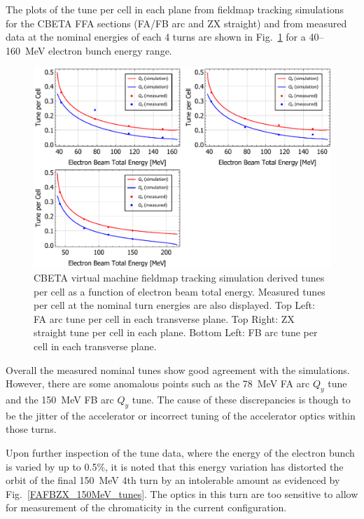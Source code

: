 \documentclass[../main.tex]{subfiles}
\begin{document}
The plots of the tune per cell in each plane from fieldmap tracking simulations for the CBETA FFA sections (FA/FB arc and ZX straight) and from measured data at the nominal energies of each 4 turns are shown in Fig.~\ref{fig:fieldmap_chromaticity_tune} for a 40--160~\si{\mega\electronvolt} electron bunch energy range.
\begin{figure}[!h]
\centering
\includegraphics[width=\textwidth]{Figures/CBETA_Multi-Pass_Commissioning/chromaticity/FAFBZX_nominal_tunes.pdf}
\caption{CBETA virtual machine fieldmap tracking simulation derived tunes per cell as a function of electron beam total energy. Measured tunes per cell at the nominal turn energies are also displayed. Top Left: FA arc tune per cell in each transverse plane. Top Right: ZX straight tune per cell in each plane. Bottom Left: FB arc tune per cell in each transverse plane. }
\label{fig:fieldmap_chromaticity_tune}
\end{figure}

Overall the measured nominal tunes show good agreement with the simulations. However, there are some anomalous points such as the 78~\si{\mega\electronvolt} FA arc $Q_{y}$ tune and the 150~\si{\mega\electronvolt} FB arc $Q_{y}$ tune. The cause of these discrepancies is though to be the jitter of the accelerator or incorrect tuning of the accelerator optics within those turns.

Upon further inspection of the tune data, where the energy of the electron bunch is varied by up to 0.5\%, it is noted that this energy variation has distorted the orbit of the final 150~\si{\mega\electronvolt} 4th turn by an intolerable amount as evidenced by Fig.~\ref{FAFBZX_150MeV_tunes}. The optics in this turn are too sensitive to allow for measurement of the chromaticity in the current configuration.
\end{document}
